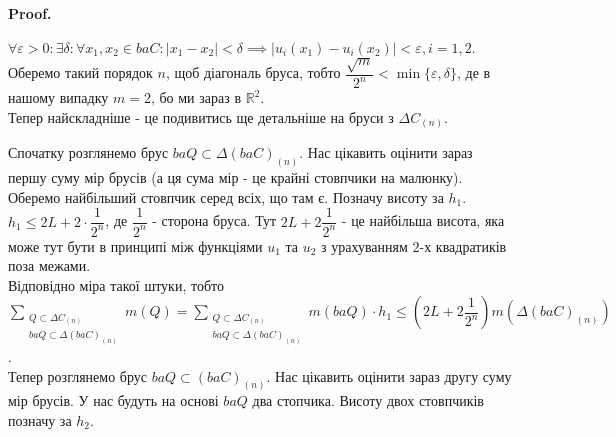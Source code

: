 \documentclass[a4paper, 10pt]{article}
\makeatletter
\def\qed{$\blacksquare$}
\theoremstyle{theoremdd}
\theoremstyle{theoremdd}
\theoremstyle{theoremdd}
\theoremstyle{theoremdd}
\theoremstyle{theoremdd}
\theoremstyle{theoremdd}
\theoremstyle{theoremdd}
\theoremstyle{theoremdd}
\renewenvironment{proof}[1][Proof.\\]{\par
\pushQED{\hfill \qed}%
\normalfont \topsep6\p@\@plus6\p@\relax
\trivlist
\item\relax
{\bfseries
#1\@addpunct{.}}\hspace\labelsep\ignorespaces
}{%
\popQED\endtrivlist\@endpefalse
}
\makeatother
\begin{document}
\begin{proof}
$\forall \varepsilon > 0: \exists \delta: \forall x_1,x_2 \in baC: |x_1-x_2| < \delta \implies |u_i(x_1) - u_i(x_2)| < \varepsilon, i = 1,2$.\\
Оберемо такий порядок $n$, щоб діагональ бруса, тобто $\dfrac{\sqrt{m}}{2^n} < \min\{\varepsilon,\delta\}$, де в нашому випадку $m = 2$, бо ми зараз в $\mathbb{R}^2$.\\
Тепер найскладніше - це подивитись ще детальніше на бруси з $\Delta C_{(n)}$.
\begin{figure}[H]
\centering
{}
\end{figure}
Спочатку розглянемо брус $baQ \subset \Delta (baC)_{(n)}$. Нас цікавить оцінити зараз першу суму мір брусів (а ця сума мір - це крайні стовпчики на малюнку). Оберемо найбільший стовпчик серед всіх, що там є. Позначу висоту за $h_1$.\\
$h_1 \leq 2L + 2 \cdot \dfrac{1}{2^n}$, де $\dfrac{1}{2^n}$ - сторона бруса. Тут $2L + 2 \dfrac{1}{2^n}$ - це найбільша висота, яка може тут бути в принципі між функціями $u_1$ та $u_2$ з урахуванням $2$-х квадратиків поза межами.\\
Відповідно міра такої штуки, тобто $\displaystyle\sum_{\substack{Q \subset \Delta C_{(n)} \\ baQ \subset \Delta (baC)_{(n)} }} m(Q) = \sum_{\substack{Q \subset \Delta C_{(n)} \\ baQ \subset \Delta (baC)_{(n)} }}  m(baQ) \cdot h_1 \leq \left( 2L + 2\dfrac{1}{2^n} \right) m(\Delta (baC)_{(n)})$.
\bigskip \\
Тепер розглянемо брус $baQ \subset (baC)_{(n)}$. Нас цікавить оцінити зараз другу суму мір брусів. У нас будуть на основі $baQ$ два стопчика. Висоту двох стовпчиків позначу за $h_2$.\\

\end{proof}
\end{document}
